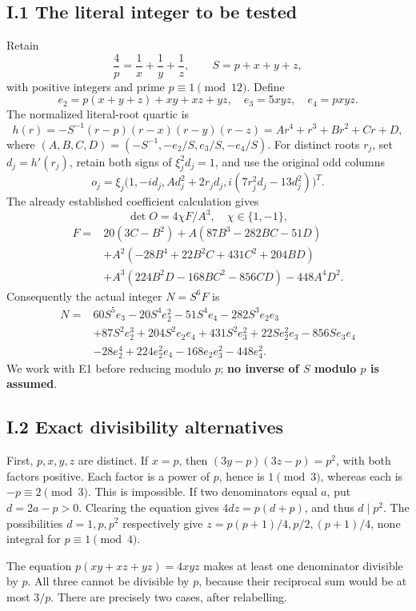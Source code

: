 \subsection{I.1 The literal integer to be
tested}\label{i.1-the-literal-integer-to-be-tested}

Retain \[
\frac4p=\frac1x+\frac1y+\frac1z,\qquad
S=p+x+y+z,
\] with positive integers and prime \(p\equiv1\pmod{12}\). Define \[
e_2=p(x+y+z)+xy+xz+yz,\quad e_3=5xyz,\quad e_4=pxyz.
\] The normalized literal-root quartic is \[
h(r)=-S^{-1}(r-p)(r-x)(r-y)(r-z)
=Ar^4+r^3+Br^2+Cr+D,
\] where \((A,B,C,D)=(-S^{-1},-e_2/S,e_3/S,-e_4/S)\). For distinct roots
\(r_j\), set \(d_j=h'(r_j)\), retain both signs of \(\xi_j^2d_j=1\), and
use the original odd columns \[
o_j=\xi_j\bigl(1,-id_j,Ad_j^2+2r_jd_j,
 i(7r_j^2d_j-13d_j^2)\bigr)^T.
\] The already established coefficient calculation gives \[
\det O=4\chi F/A^3,\quad \chi\in\{1,-1\},
\] \[
\begin{aligned}
F={}&20(3C-B^2)+A(87B^3-282BC-51D)\\
&+A^2(-28B^4+22B^2C+431C^2+204BD)\\
&+A^3(224B^2D-168BC^2-856CD)-448A^4D^2.
\end{aligned}
\] Consequently the actual integer \(N=S^6F\) is \[
\begin{aligned}
N={}&60S^5e_3-20S^4e_2^2-51S^4e_4-282S^3e_2e_3\\
&+87S^2e_2^3+204S^2e_2e_4+431S^2e_3^2
 +22Se_2^2e_3-856Se_3e_4\\
&-28e_2^4+224e_2^2e_4-168e_2e_3^2-448e_4^2.
\end{aligned}\tag{E1}
\] We work with E1 before reducing modulo \(p\); \textbf{no inverse of
\(S\) modulo \(p\) is assumed}.

\subsection{I.2 Exact divisibility
alternatives}\label{i.2-exact-divisibility-alternatives}

First, \(p,x,y,z\) are distinct. If \(x=p\), then \((3y-p)(3z-p)=p^2\),
with both factors positive. Each factor is a power of \(p\), hence is
\(1\pmod3\), whereas each is \(-p\equiv2\pmod3\). This is impossible. If
two denominators equal \(a\), put \(d=2a-p>0\). Clearing the equation
gives \(4dz=p(d+p)\), and thus \(d\mid p^2\). The possibilities
\(d=1,p,p^2\) respectively give \(z=p(p+1)/4,p/2,(p+1)/4\), none
integral for \(p\equiv1\pmod4\).

The equation \(p(xy+xz+yz)=4xyz\) makes at least one denominator
divisible by \(p\). All three cannot be divisible by \(p\), because
their reciprocal sum would be at most \(3/p\). There are precisely two
cases, after relabelling.

